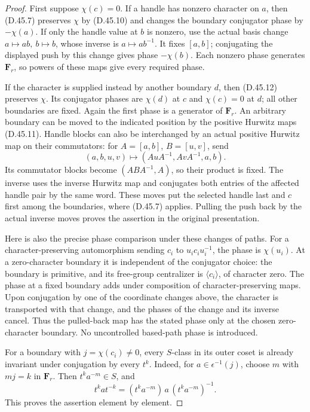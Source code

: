 \begin{proof}
First suppose \(\chi(c)=0\). If a handle has nonzero
character on \(a\), then \textup{(D.45.7)} preserves
\(\chi\) by \textup{(D.45.10)} and changes the
boundary conjugator phase by \(-\chi(a)\).
If only the handle value at \(b\) is nonzero, use
the actual basis change \(a\mapsto ab,\ b\mapsto b\),
whose inverse is \(a\mapsto ab^{-1}\).
It fixes \([a,b]\); conjugating the displayed push
by this change gives phase \(-\chi(b)\).
Each nonzero phase generates \(\mathbf F_r\), so
powers of these maps give every required phase.

If the character is supplied instead by another
boundary \(d\), then \textup{(D.45.12)} preserves
\(\chi\). Its conjugator phases are \(\chi(d)\)
at \(c\) and \(\chi(c)=0\) at \(d\); all other
boundaries are fixed. Again the first phase is a
generator of \(\mathbf F_r\).
An arbitrary boundary can be moved to the indicated
position by the positive Hurwitz maps
\textup{(D.45.11)}.
Handle blocks can also be interchanged by an actual
positive Hurwitz map on their commutators: for
\(A=[a,b]\), \(B=[u,v]\), send
\[
 (a,b,u,v)\longmapsto
       (A uA^{-1},A vA^{-1},a,b).
 \tag{D.45.13}
\]
Its commutator blocks become \((ABA^{-1},A)\),
so their product is fixed. The inverse uses the
inverse Hurwitz map and conjugates both entries of
the affected handle pair by the same word.
These moves put the selected handle last and \(c\)
first among the boundaries, where
\textup{(D.45.7)} applies. Pulling the push back by
the actual inverse moves proves the assertion in
the original presentation.

Here is also the precise phase comparison under
these changes of paths. For a character-preserving
automorphism sending \(c_i\) to \(u_ic_iu_i^{-1}\),
the phase is \(\chi(u_i)\).
At a zero-character boundary it is independent of
the conjugator choice: the boundary is primitive,
and its free-group centralizer is
\(\langle c_i\rangle\), of character zero.
The phase at a fixed boundary adds under composition
of character-preserving maps.
Upon conjugation by one of the coordinate changes
above, the character is transported with that
change, and the phases of the change and its inverse
cancel. Thus the pulled-back map has the stated
phase only at the chosen zero-character boundary.
No uncontrolled based-path phase is introduced.

For a boundary with \(j=\chi(c_i)\ne0\), every
\(S\)-class in its outer coset is already invariant
under conjugation by every \(t^k\).
Indeed, for \(a\in\epsilon^{-1}(j)\), choose
\(m\) with \(mj=k\) in \(\mathbf F_r\).
Then \(t^ka^{-m}\in S\), and
\[
       t^k a t^{-k}
        =(t^ka^{-m})\,a\,(t^ka^{-m})^{-1}.
 \tag{D.45.14}
\]
This proves the assertion element by element.


\end{proof}

